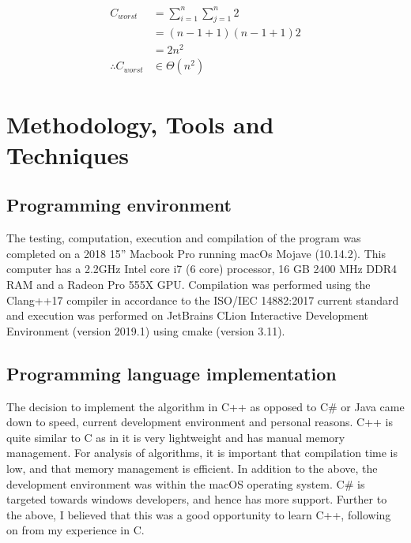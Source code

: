 \documentclass[12pt]{article}
\begin{document}
	\begin{align*}
	C_{worst} &= \sum\limits_{i=1}^{n} \sum\limits_{j=1}^{n}2\\
					&= (n-1+1)(n-1+1)2\\
					&= 2n^2\\
	\therefore C_{worst} &\in \Theta(n^2)
	\end{align*}
	
	
\section{Methodology, Tools and Techniques}
	\subsection{Programming environment}
	The testing, computation, execution and compilation of the program was completed on a 2018 15” Macbook Pro running macOs Mojave (10.14.2). This computer has a 2.2GHz Intel core i7 (6 core) processor, 16 GB 2400 MHz DDR4 RAM and a Radeon Pro 555X GPU. Compilation was performed using the Clang++17 compiler in accordance to the ISO/IEC 14882:2017 current standard and execution was performed on JetBrains CLion Interactive Development Environment (version 2019.1) using cmake (version 3.11).
	\subsection{Programming language implementation}
	The decision to implement the algorithm in C++ as opposed to C\# or Java came down to speed, current development environment and personal reasons. C++ is quite similar to C as in it is very lightweight and has manual memory management. For analysis of algorithms, it is important that compilation time is low, and that memory management is efficient. In addition to the above, the development environment was within the macOS operating system. C\# is targeted towards windows developers, and hence has more support. Further to the above, I believed that this was a good opportunity to learn C++, following on from my experience in C.
\end{document}
